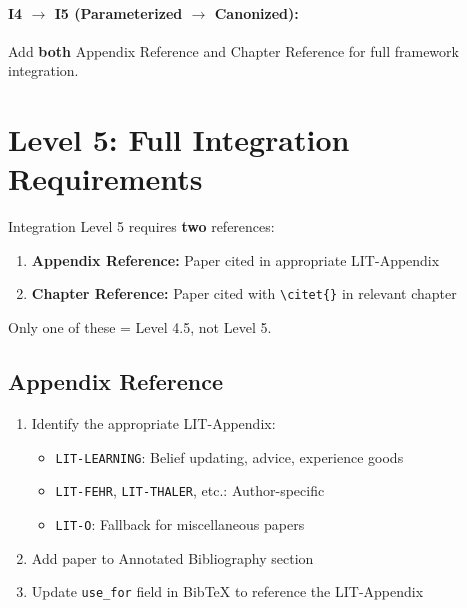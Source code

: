 \paragraph{I4 $\rightarrow$ I5 (Parameterized $\rightarrow$ Canonized):}
Add \textbf{both} Appendix Reference and Chapter Reference for full framework integration.


\section{Level 5: Full Integration Requirements}
\label{sec:paperint-level5}

\begin{tcolorbox}[colback=red!5!white, colframe=red!75!black,
    title=Critical: Level 5 Requires BOTH Appendix AND Chapter]
Integration Level 5 requires \textbf{two} references:
\begin{enumerate}
    \item \textbf{Appendix Reference:} Paper cited in appropriate LIT-Appendix
    \item \textbf{Chapter Reference:} Paper cited with \texttt{\textbackslash citet\{\}} in relevant chapter
\end{enumerate}
Only one of these = Level 4.5, not Level 5.
\end{tcolorbox}

\subsection{Appendix Reference}

\begin{enumerate}
    \item Identify the appropriate LIT-Appendix:
    \begin{itemize}
        \item \texttt{LIT-LEARNING}: Belief updating, advice, experience goods
        \item \texttt{LIT-FEHR}, \texttt{LIT-THALER}, etc.: Author-specific
        \item \texttt{LIT-O}: Fallback for miscellaneous papers
    \end{itemize}
    \item Add paper to Annotated Bibliography section
    \item Update \texttt{use\_for} field in BibTeX to reference the LIT-Appendix
\end{enumerate}


